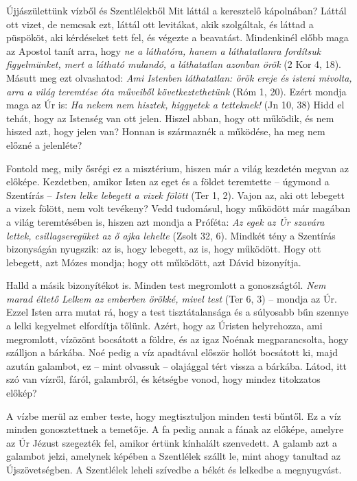 \documentclass[twoside]{article}
\begin{document}
\begin{lectio}{Újjászülettünk vízből és Szentlélekből}
\noindent Mit láttál a keresztelő kápolnában? Láttál ott vizet, de nemcsak ezt, láttál ott levitákat, akik szolgáltak, és láttad a püspököt, aki kérdéseket tett fel, és végezte a beavatást. Mindenkinél előbb maga az Apostol tanít arra, hogy \textit{ne a láthatóra, hanem a láthatatlanra fordítsuk figyelmünket, mert a látható mulandó, a láthatatlan azonban örök} (2 Kor 4, 18). Másutt meg ezt olvashatod: \textit{Ami Istenben láthatatlan: örök ereje és isteni mivolta, arra a világ teremtése óta műveiből következtethetünk} (Róm 1, 20). Ezért mondja maga az Úr is: \textit{Ha nekem nem hisztek, higgyetek a tetteknek!} (Jn 10, 38) Hidd el tehát, hogy az Istenség van ott jelen. Hiszel abban, hogy ott működik, és nem hiszed azt, hogy jelen van? Honnan is származnék a működése, ha meg nem előzné a jelenléte?

Fontold meg, mily ősrégi ez a misztérium, hiszen már a világ kezdetén megvan az előképe. Kezdetben, amikor Isten az eget és a földet teremtette – úgymond a Szentírás – \textit{Isten lelke lebegett a vizek fölött} (Ter 1, 2). Vajon az, aki ott lebegett a vizek fölött, nem volt tevékeny? Vedd tudomásul, hogy működött már magában a világ teremtésében is, hiszen azt mondja a Próféta: \textit{Az egek az Úr szavára lettek, csillagseregüket az ő ajka lehelte} (Zsolt 32, 6). Mindkét tény a Szentírás bizonyságán nyugszik: az is, hogy lebegett, az is, hogy működött. Hogy ott lebegett, azt Mózes mondja; hogy ott működött, azt Dávid bizonyítja.

Halld a másik bizonyítékot is. Minden test megromlott a gonoszságtól. \textit{Nem marad éltető Lelkem az emberben örökké, mivel test} (Ter 6, 3) – mondja az Úr. Ezzel Isten arra mutat rá, hogy a test tisztátalansága és a súlyosabb bűn szennye a lelki kegyelmet elfordítja tőlünk. Azért, hogy az Úristen helyrehozza, ami megromlott, vízözönt bocsátott a földre, és az igaz Noénak megparancsolta, hogy szálljon a bárkába. Noé pedig a víz apadtával először hollót bocsátott ki, majd azután galambot, ez – mint olvassuk – olajággal tért vissza a bárkába. Látod, itt szó van vízről, fáról, galambról, és kétségbe vonod, hogy mindez titokzatos előkép?

A vízbe merül az ember teste, hogy megtisztuljon minden testi bűntől. Ez a víz minden gonosztettnek a temetője. A fa pedig annak a fának az előképe, amelyre az Úr Jézust szegezték fel, amikor értünk kínhalált szenvedett. A galamb azt a galambot jelzi, amelynek képében a Szentlélek szállt le, mint ahogy tanultad az Újszövetségben. A Szentlélek leheli szívedbe a békét és lelkedbe a megnyugvást.
\end{lectio}
\end{document}
